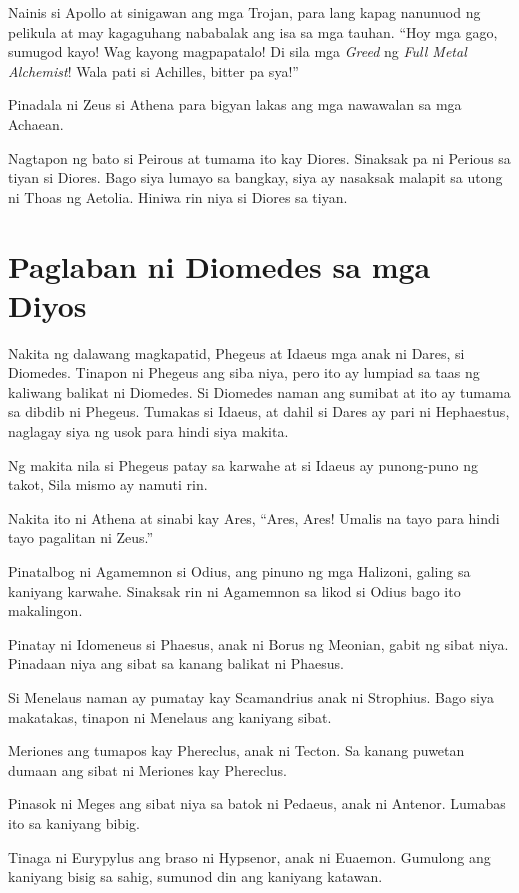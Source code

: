 \documentclass[12pt,letterpaper]{report}
\begin{document}
Nainis si Apollo at sinigawan ang mga Trojan, para lang kapag nanunuod ng pelikula at may kagaguhang nababalak ang isa sa mga tauhan. ``Hoy mga gago, sumugod kayo! Wag kayong magpapatalo! Di sila mga \textit{Greed} ng \textit{Full Metal Alchemist}! Wala pati si Achilles, bitter pa sya!''

Pinadala ni Zeus si Athena para bigyan lakas ang mga nawawalan sa mga Achaean.

Nagtapon ng bato si Peirous at tumama ito kay Diores. Sinaksak pa ni Perious sa tiyan si Diores. Bago siya lumayo sa bangkay, siya ay nasaksak malapit sa utong ni Thoas ng Aetolia. Hiniwa rin niya si Diores sa tiyan. \pagebreak
\chapter{Paglaban ni Diomedes sa mga Diyos}

Nakita ng dalawang magkapatid, Phegeus at Idaeus mga anak ni Dares, si Diomedes. Tinapon ni Phegeus ang siba niya, pero ito ay lumpiad sa taas ng kaliwang balikat ni Diomedes. Si Diomedes naman ang sumibat at ito ay tumama sa dibdib ni Phegeus. Tumakas si Idaeus, at dahil si Dares ay pari ni Hephaestus, naglagay siya ng usok para hindi siya makita.

Ng makita nila si Phegeus patay sa karwahe at si Idaeus ay punong-puno ng takot, Sila mismo ay namuti rin.

Nakita ito ni Athena at sinabi kay Ares, ``Ares, Ares! Umalis na tayo para hindi tayo pagalitan ni Zeus.''

Pinatalbog ni Agamemnon si Odius, ang pinuno ng mga Halizoni, galing sa kaniyang karwahe. Sinaksak rin ni Agamemnon sa likod si Odius bago ito makalingon.

Pinatay ni Idomeneus si Phaesus, anak ni Borus ng Meonian, gabit ng sibat niya. Pinadaan niya ang sibat sa kanang balikat ni Phaesus.

Si Menelaus naman ay pumatay kay Scamandrius anak ni Strophius. Bago siya makatakas, tinapon ni Menelaus ang kaniyang sibat.

Meriones ang tumapos kay Phereclus, anak ni Tecton. Sa kanang puwetan dumaan ang sibat ni Meriones kay Phereclus.

Pinasok ni Meges ang sibat niya sa batok ni Pedaeus, anak ni Antenor. Lumabas ito sa kaniyang bibig.

Tinaga ni Eurypylus ang braso ni Hypsenor, anak ni Euaemon. Gumulong ang kaniyang bisig sa sahig, sumunod din ang kaniyang katawan.
\end{document}
